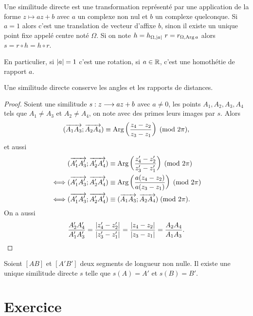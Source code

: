 Une similitude directe est une transformation représenté par une application de 
la forme \(z \longmapsto az + b\) avec \(a\) un complexe non nul et \(b\) un 
complexe quelconque. Si \(a = 1\) alors c'est une translation de vecteur 
d'affixe \(b\), sinon il existe un unique point fixe appelé centre noté 
\(\Omega\). Si on note \(h = h_{\Omega, \left\lvert a\right\rvert} \ r = r_{\Omega, \operatorname{Arg}{a}}\) 
alors \(s = r \circ h = h \circ r\).

En particulier, si \(\left\lvert a\right\rvert = 1\) c'est une rotation, si \(a \in \mathbb{R}\), c'est 
une homothétie de rapport \(a\).

\begin{prop}
    Une similitude directe conserve les angles et les rapports de distances.
\end{prop}

\begin{proof}
    Soient une similitude \(s:z \longrightarrow az + b\) avec \(a \neq 0\), les 
    points \(A_1, A_2, A_3, A_4\) tels que \(A_1 \neq A_3\) et \(A_2 \neq A_4\), 
    on note avec des primes leurs images par \(s\). Alors
    \begin{equation}
        (\overrightarrow{A_1 A_3};\overrightarrow{A_2 A_4}) \equiv \operatorname{Arg}\left(\frac{z_4 - z_2}{z_3 
        - z_1}\right)\!\pmod {2\pi},
    \end{equation}
    et aussi
    \begin{align}
    &(\overrightarrow{A'_1 A'_3};\overrightarrow{A'_2 A'_4}) \equiv \operatorname{Arg}\left(\frac{z'_4 - 
    z'_2}{z'_3 - z'_1}\right)\!\pmod {2\pi}\\
        \iff&(\overrightarrow{A'_1 A'_3};\overrightarrow{A'_2 A'_4}) \equiv \operatorname{Arg}\left(\frac{a(z_4 
        - z_2)}{a(z_3 - z_1)}\right)\!\pmod {2\pi}\\
        \iff&(\overrightarrow{A'_1 A'_3};\overrightarrow{A'_2 A'_4}) \equiv (\overrightarrow{A_1 
        A_3};\overrightarrow{A_2 A_4})\!\pmod {2\pi}.
    \end{align}
    On a aussi
    \begin{equation}
        \frac{A'_2A'_4}{A'_1A'_3} = \frac{\left\lvert z'_4 - z'_2\right\rvert}{\left\lvert z'_3 - z'_1\right\rvert} 
        = \frac{\left\lvert z_4 - z_2\right\rvert}{\left\lvert z_3 - z_1\right\rvert} = \frac{A_2A_4}{A_1A_3}.
    \end{equation}
\end{proof}

\begin{prop}
    Soient \([AB]\) et \([A'B']\) deux segments de longueur non nulle. Il existe 
    une unique similitude directe \(s\) telle que \(s(A) = A'\) et \(s(B) = 
    B'\).
\end{prop}

\section{Exercice}

